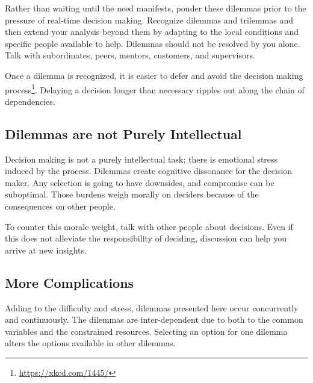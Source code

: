 



Rather than waiting until the need manifests, ponder these dilemmas prior to the pressure of real-time decision making.  Recognize dilemmas and trilemmas and then extend your analysis beyond them by adapting to the local conditions and specific people available to help.
Dilemmas should not be resolved by you alone. Talk with subordinates, peers, mentors, customers, and supervisors.


Once a dilemma is recognized, it is easier to defer and avoid the  decision making process\footnote{\href{https://xkcd.com/1445/}{https://xkcd.com/1445/}}. Delaying a decision longer than necessary ripples out along the chain of dependencies. 

\subsection*{Dilemmas are not Purely Intellectual}
Decision making is not a purely intellectual task; there is emotional stress induced by the process. Dilemmas create cognitive dissonance for the decision maker. Any selection is going to have downsides, and compromise can be suboptimal. Those burdens weigh morally on deciders because of the consequences on other people.

To counter this morale weight, talk with other people about decisions. 
Even if this does not alleviate the responsibility of deciding, discussion can help you arrive at new insights. 

\subsection*{More Complications}
Adding to the difficulty and stress, dilemmas presented here occur concurrently and continuously. The dilemmas are inter-dependent due to both to the common variables and the constrained resources.
Selecting an option for one dilemma alters the options available in other dilemmas.

